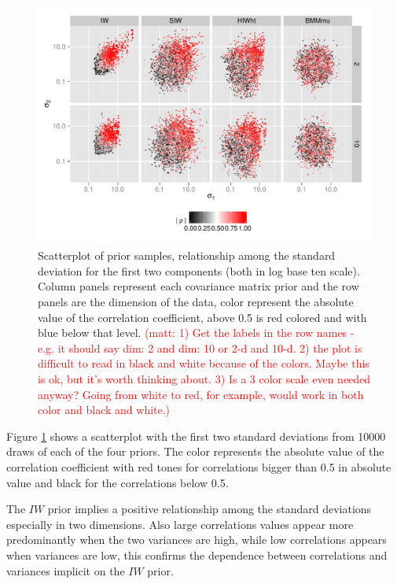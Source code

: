 \documentclass[a4paper]{article}
\newcommand{\matt}[1]{\textcolor{red}{(matt: #1)}}
\begin{document}
\begin{figure}[htbp]
\begin{center}
 \includegraphics[width=\textwidth ]{prior_sis2} 
  \vspace{-.5in}
\caption{Scatterplot of prior samples, relationship among the standard deviation for the first two components (both in log base ten scale).  Column panels represent each covariance matrix prior and the row panels are the dimension of the data, color represent the absolute value of the correlation coefficient, above 0.5 is red colored and with blue below that level.  \label{priorF2} 
\matt{ 1) Get the labels in the row names - e.g. it should say dim: 2 and dim: 10 or 2-d and 10-d. 2) the plot is difficult to read in black and white because of the colors. Maybe this is ok, but it's worth thinking about. 3) Is a 3 color scale even needed anyway? Going from white to red, for example, would work in both color and black and white.} }
\end{center}
\end{figure}

Figure \ref{priorF2} shows a scatterplot with the first two standard deviations from 10000 draws of each of the four priors. The color represents the absolute value of the correlation coefficient with red tones for correlations bigger than 0.5 in absolute value and black for the correlations below 0.5. 

The $IW$ prior implies a positive relationship among the standard deviations especially in two dimensions. Also large correlations values appear more predominantly when the two variances are high, while low correlations appears when variances are low, this confirms the dependence between correlations and variances implicit on the $IW$ prior. 
\end{document}
